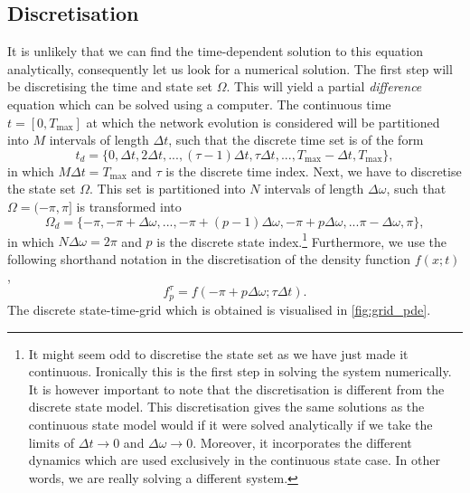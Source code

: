 \subsection{Discretisation}
It is unlikely that we can find the time-dependent solution to this equation analytically, consequently let us look for a numerical solution. The first step will be discretising the time and state set $\Omega$. This will yield a partial \textit{difference} equation which can be solved using a computer.
The continuous time $t = [0, T_{\text{max}}]$ at which the network evolution is considered will be partitioned into $M$ intervals of length $\Delta t$, such that the discrete time set is of the form 
\[ t_d= \{0, \Delta t, 2 \Delta t, ... , (\tau-1) \Delta t,  \tau\Delta t, ..., T_{\text{max}} - \Delta t, T_{\text{max}}  \}, \]
in which $M \Delta t = T_{\text{max}}$ and $\tau$ is the discrete time index. Next, we have to discretise the state set $\Omega$. This set is partitioned into $N$ intervals of length $\Delta \omega$, such that $\Omega = (-\pi,\pi]$ is transformed into 
\[\Omega_d = \{-\pi, -\pi+\Delta\omega,...,-\pi+ (p-1) \Delta\omega, -\pi+ p \Delta\omega, ... \pi-\Delta\omega, \pi \}, \]
in which $N \Delta \omega = 2\pi$ and $p$ is the discrete state index.\footnote{It might seem odd to discretise the state set as we have just made it continuous. Ironically this is the first step in solving the system numerically. It is however important to note that the discretisation is different from the discrete state model. This discretisation gives the same solutions as the continuous state model would if it were solved analytically if we take the limits of $\Delta t \to 0$ and $\Delta \omega \to 0$. Moreover, it incorporates the different dynamics which are used exclusively in the continuous state case. In other words, we are really solving a different system.}
Furthermore, we use the following shorthand notation in the discretisation of the density function $f(x;t)$, 
\[
f_{p}^{\tau } = f(-\pi+p\Delta \omega; \tau \Delta t).
\]
The discrete state-time-grid which is obtained is visualised in \cref{fig:grid_pde}.

